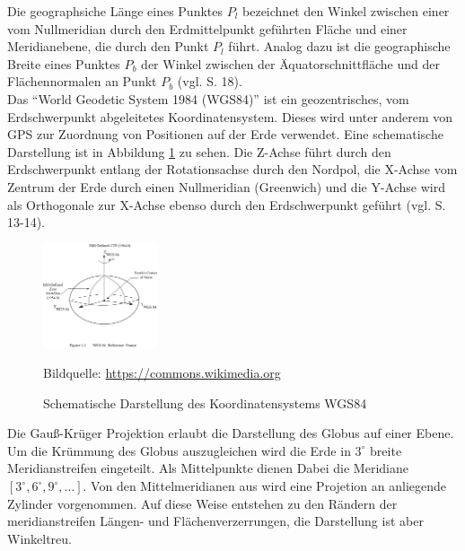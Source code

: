 Die geographsiche Länge eines Punktes $P_l$ bezeichnet den Winkel zwischen einer vom Nullmeridian durch den Erdmittelpunkt geführten Fläche und einer Meridianebene, die durch den Punkt $P_l$ führt.
Analog dazu ist die geographische Breite eines Punktes $P_b$ der Winkel zwischen der Äquatorschnittfläche und der Flächennormalen an Punkt $P_b$ (vgl.  \cite{witte2011vermessungskunde} S. 18).
\\

Das "`World Geodetic System 1984 (WGS84)"' ist ein geozentrisches, vom Erdschwerpunkt abgeleitetes Koordinatensystem. Dieses wird unter anderem von GPS zur Zuordnung von Positionen auf der Erde verwendet. Eine schematische Darstellung ist in Abbildung \ref{fig:wgs84} zu sehen. Die  Z-Achse führt durch den Erdschwerpunkt entlang der Rotationsachse durch den Nordpol, die X-Achse vom Zentrum der Erde durch einen Nullmeridian (Greenwich) und die Y-Achse wird als Orthogonale zur X-Achse ebenso durch den Erdschwerpunkt geführt (vgl. \cite{witte2011vermessungskunde} S. 13-14).


\begin{figure}[h!]
 \centering
 \includegraphics[width=0.3\textwidth, trim={0 9cm 0 3cm},clip]{pix/WGS_84_reference_frame.png}
 \caption[Schematische Darstellung des Koordinatensystems WGS84]
 {Schematische Darstellung des Koordinatensystems WGS84}
 \footnotesize{
    Bildquelle: \href{https://commons.wikimedia.org/wiki/File:WGS_84_reference_frame_(vector_graphic).svg}
                {\url{https://commons.wikimedia.org}}
 }
 \label{fig:wgs84}
\end{figure}



Die Gauß-Krüger Projektion erlaubt die Darstellung des Globus auf einer Ebene. Um die Krümmung des Globus auszugleichen wird die Erde in $3^\circ$ breite Meridianstreifen eingeteilt. Als Mittelpunkte dienen Dabei die Meridiane $[ 3^\circ, 6^\circ, 9^\circ, \dots]$. Von den Mittelmeridianen aus wird eine Projetion an anliegende Zylinder vorgenommen. Auf diese Weise entstehen zu den Rändern der meridianstreifen Längen- und Flächenverzerrungen, die Darstellung ist aber Winkeltreu.
\\

